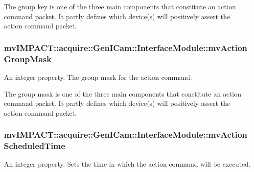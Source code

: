 The group key is one of the three main components that constitute an action command packet. It partly defines which device(s) will positively assert the action command packet. \hypertarget{classmv_i_m_p_a_c_t_1_1acquire_1_1_gen_i_cam_1_1_interface_module_acc6eccc0403bf6b7b5ea6cee07d5f77e}{
\subsubsection[{mv\+Action\+Group\+Mask}]{ mv\+I\+M\+P\+A\+C\+T\+::acquire\+::\+Gen\+I\+Cam\+::\+Interface\+Module\+::mv\+Action\+Group\+Mask}}\label{classmv_i_m_p_a_c_t_1_1acquire_1_1_gen_i_cam_1_1_interface_module_acc6eccc0403bf6b7b5ea6cee07d5f77e}


An integer property. The group mask for the action command. 

The group mask is one of the three main components that constitute an action command packet. It partly defines which device(s) will positively assert the action command packet. \hypertarget{classmv_i_m_p_a_c_t_1_1acquire_1_1_gen_i_cam_1_1_interface_module_abf03846f45ce7ca7988b9c45259bdba4}{
\subsubsection[{mv\+Action\+Scheduled\+Time}]{ mv\+I\+M\+P\+A\+C\+T\+::acquire\+::\+Gen\+I\+Cam\+::\+Interface\+Module\+::mv\+Action\+Scheduled\+Time}}\label{classmv_i_m_p_a_c_t_1_1acquire_1_1_gen_i_cam_1_1_interface_module_abf03846f45ce7ca7988b9c45259bdba4}


An integer property. Sets the time in which the action command will be executed. 

